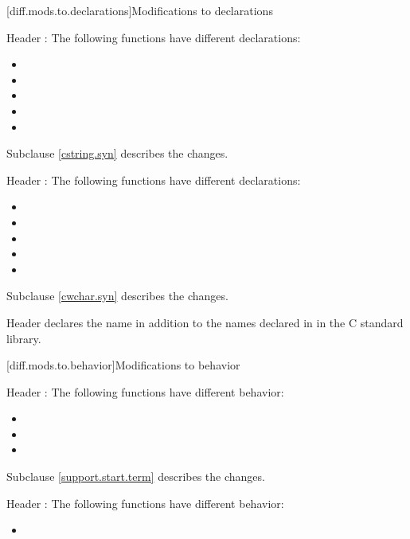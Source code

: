 [diff.mods.to.declarations]{Modifications to declarations}

\pnum
Header :
The following functions have different declarations:

\begin{itemize}
\item {}
\item {}
\item {}
\item {}
\item {}
\end{itemize}

Subclause \ref{cstring.syn} describes the changes.

\pnum
Header :
The following functions have different declarations:

\begin{itemize}
\item {}
\item {}
\item {}
\item {}
\item {}
\end{itemize}

Subclause \ref{cwchar.syn} describes the changes.

\pnum
Header 
declares the name  in addition to the names declared in
 in the C standard library.

[diff.mods.to.behavior]{Modifications to behavior}

\pnum
Header :
The following functions have different behavior:

\begin{itemize}
\item {}
\item {}
\item {}
\end{itemize}

Subclause \ref{support.start.term} describes the changes.

\pnum
Header :
The following functions have different behavior:

\begin{itemize}
\item {}
\end{itemize}

